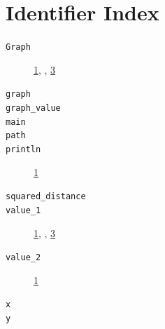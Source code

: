\documentclass[12pt]{article}
\begin{document}
\section*{Identifier Index}
\begin{description}
\item[\texttt{Graph}] \hyperlink{litweb-1-1}{1}, , \hyperlink{litweb-1-3}{3}
\item[\texttt{graph}] 
\item[\texttt{graph\_value}] 
\item[\texttt{main}] 
\item[\texttt{path}] 
\item[\texttt{println}] \hyperlink{litweb-1-1}{1}
\item[\texttt{squared\_distance}] 
\item[\texttt{value\_1}] \hyperlink{litweb-1-1}{1}, , \hyperlink{litweb-1-3}{3}
\item[\texttt{value\_2}] \hyperlink{litweb-1-1}{1}
\item[\texttt{x}] 
\item[\texttt{y}] 
\end{description}
\end{document}
